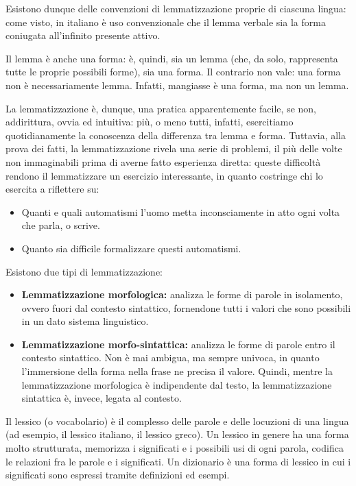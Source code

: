 \documentclass{article}
\theoremstyle{plain}
\theoremstyle{definition}
\begin{document}
Esistono dunque delle convenzioni di lemmatizzazione proprie di ciascuna lingua: come visto, in italiano è uso convenzionale che il lemma verbale sia la forma coniugata all'infinito presente attivo.

Il lemma è anche una forma:  è, quindi, sia un lemma (che, da solo, rappresenta tutte le proprie possibili forme), sia una forma. Il contrario non vale: una forma non è necessariamente lemma. Infatti, mangiasse è una forma, ma non un lemma.

La lemmatizzazione è, dunque, una pratica apparentemente facile, se non, addirittura, ovvia ed intuitiva: più, o meno tutti, infatti, esercitiamo quotidianamente la conoscenza della differenza tra lemma e forma. Tuttavia,
alla prova dei fatti, la lemmatizzazione rivela una serie di problemi, il più delle volte non immaginabili prima di averne fatto esperienza diretta: queste difficoltà rendono il lemmatizzare un esercizio interessante, in quanto costringe chi lo esercita a riflettere su:

\begin{itemize}  
\item Quanti e quali automatismi l'uomo metta inconsciamente in atto ogni
volta che parla, o scrive.
\item Quanto sia difficile formalizzare questi automatismi.
\end{itemize}

Esistono due tipi di lemmatizzazione:

\begin{itemize}  
\item \textbf{Lemmatizzazione morfologica:} analizza le forme di parole in isolamento, ovvero fuori
dal contesto sintattico, fornendone tutti i valori che sono possibili in
un dato sistema linguistico.
\item \textbf{Lemmatizzazione morfo-sintattica:} analizza le forme di parole entro il contesto sintattico. Non è mai ambigua, ma sempre univoca, in quanto l'immersione della forma nella frase ne precisa il valore. Quindi, mentre la lemmatizzazione morfologica è indipendente dal testo, la lemmatizzazione
sintattica è, invece, legata al contesto.
\end{itemize}

Il lessico (o vocabolario) è il complesso delle parole e delle locuzioni di una lingua (ad esempio, il lessico italiano, il lessico greco). Un lessico in genere ha una forma molto strutturata, memorizza i significati e i possibili usi di ogni parola, codifica le relazioni fra le parole e i significati. Un dizionario è una forma di lessico in cui i significati sono espressi tramite definizioni ed esempi.
\end{document}
